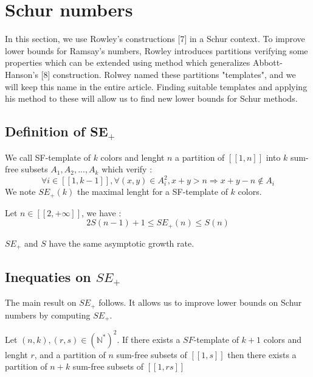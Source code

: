 \section{Schur numbers}

\qquad In this section, we use Rowley's constructions [7] in a Schur context. To improve lower bounds for Ramsay's numbers, Rowley 
introduces partitions verifying some properties which can be extended using method which generalizes Abbott-Hanson's [8] construction. 
Rolwey named these partitions "templates", and we will keep this name in the entire article. Finding suitable templates and applying his 
method to these will allow us to find new lower bounds for Schur methods.

\subsection{Definition of SE\(_+\)}

\begin{definition}
	We call SF-template of \(k\) colors and lenght \(n\) a partition of \( [\![1,n]\!]\) into \(k\) sum-free subsets \(A_1, A_2, ..., A_k\) which verify :
	\[
	\forall i \in [\![1, k-1]\!], \forall (x,y) \in A_i^2, x+y > n
	\Longrightarrow x+y-n \notin A_i
	\]
	We note \(SE_+(k)\) the maximal lenght for a SF-template of \(k\) colors. 
\end{definition}

\begin{theorem}
	Let \(n \in [\![2, +\infty]\!]\), we have :
	\[
	2S(n-1)+1 \leqslant SE_+(n) \leqslant S(n)
	\]
\end{theorem}

\begin{remark}
	\(SE_+\) and \(S\) have the same asymptotic growth rate.
\end{remark}


\subsection{Inequaties on \(SE_+\)} 

The main result on \(SE_+\) follows. It allows us to improve lower bounds on Schur numbers by computing \(SE_+\).

\begin{theorem}
	Let $(n,k), (r,s) \in (\mathbb{N}^*)^2$. If there exists a \(SF\)-template of $k+1$ colors and lenght \(r\),
	and a partition of $n$ sum-free subsets of $[\![1,s]\!]$ then there exists a partition of $n+k$ sum-free subsets of $[\![1,rs]\!]$
\end{theorem}

